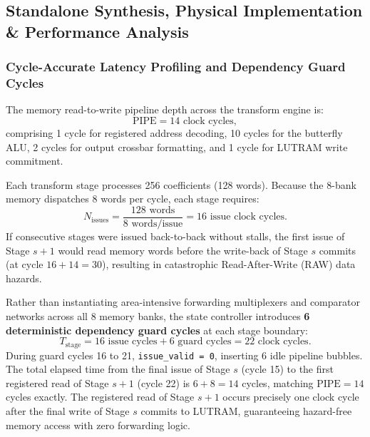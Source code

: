 \subsection{Standalone Synthesis, Physical Implementation \& Performance Analysis}
\label{sec:ntt_impl}

\subsubsection{Cycle-Accurate Latency Profiling and Dependency Guard Cycles}
The memory read-to-write pipeline depth across the transform engine is:
\begin{equation}
\label{eq:pipe_depth_total}
\text{PIPE} = 14 \text{ clock cycles},
\end{equation}
comprising 1 cycle for registered address decoding, 10 cycles for the butterfly ALU, 2 cycles for output crossbar formatting, and 1 cycle for LUTRAM write commitment.

Each transform stage processes 256 coefficients (128 words). Because the 8-bank memory dispatches 8 words per cycle, each stage requires:
\begin{equation}
\label{eq:issue_count}
N_{\text{issues}} = \frac{128 \text{ words}}{8 \text{ words/issue}} = 16 \text{ issue clock cycles}.
\end{equation}
If consecutive stages were issued back-to-back without stalls, the first issue of Stage $s+1$ would read memory words before the write-back of Stage $s$ commits (at cycle $16 + 14 = 30$), resulting in catastrophic Read-After-Write (RAW) data hazards.

Rather than instantiating area-intensive forwarding multiplexers and comparator networks across all 8 memory banks, the state controller introduces \textbf{6 deterministic dependency guard cycles} at each stage boundary:
\begin{equation}
\label{eq:stage_duration_total}
T_{\text{stage}} = 16 \text{ issue cycles} + 6 \text{ guard cycles} = 22 \text{ clock cycles}.
\end{equation}
During guard cycles 16 to 21, \texttt{issue\_valid = 0}, inserting 6 idle pipeline bubbles. The total elapsed time from the final issue of Stage $s$ (cycle 15) to the first registered read of Stage $s+1$ (cycle 22) is $6 + 8 = 14$ cycles, matching $\text{PIPE} = 14$ cycles exactly. The registered read of Stage $s+1$ occurs precisely one clock cycle after the final write of Stage $s$ commits to LUTRAM, guaranteeing hazard-free memory access with zero forwarding logic.

